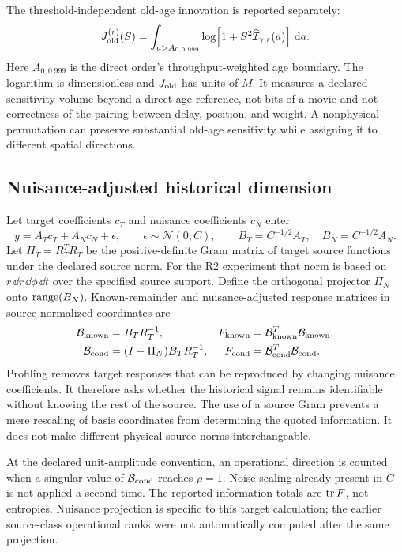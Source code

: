 The threshold-independent old-age innovation is reported separately:
\begin{equation}
J_{\rm old}^{(r)}(S)=\int_{a>A_{0,0.999}}
\log\!\left[1+S^2\widehat{\mathcal I}_{\gamma,r}(a)\right]\,\mathrm d a.
\label{eq:jold}
\end{equation}
Here $A_{0,0.999}$ is the direct order's throughput-weighted age boundary. The logarithm is dimensionless and $J_{\rm old}$ has units of $M$. It measures a declared sensitivity volume beyond a direct-age reference, not bits of a movie and not correctness of the pairing between delay, position, and weight. A nonphysical permutation can preserve substantial old-age sensitivity while assigning it to different spatial directions.

\subsection{Nuisance-adjusted historical dimension}\label{sec:nuisance}
Let target coefficients $c_T$ and nuisance coefficients $c_N$ enter
\begin{equation}
y=A_Tc_T+A_Nc_N+\epsilon,\qquad
\epsilon\sim\mathcal N(0,C),\qquad
B_T=C^{-1/2}A_T,\quad B_N=C^{-1/2}A_N.
\label{eq:targetnuisance}
\end{equation}
Let $H_T=R_T^TR_T$ be the positive-definite Gram matrix of target source functions under the declared source norm. For the R2 experiment that norm is based on $r\,\dd r\,\dd\phi\,\dd t$ over the specified source support. Define the orthogonal projector $\Pi_N$ onto $\operatorname{range}(B_N)$. Known-remainder and nuisance-adjusted response matrices in source-normalized coordinates are
\begin{align}
\mathcal B_{\rm known}&=B_TR_T^{-1},&
F_{\rm known}&=\mathcal B_{\rm known}^T\mathcal B_{\rm known},\nonumber\\
\mathcal B_{\rm cond}&=(I-\Pi_N)B_TR_T^{-1},&
F_{\rm cond}&=\mathcal B_{\rm cond}^T\mathcal B_{\rm cond}.
\label{eq:conditionalfisher}
\end{align}
Profiling removes target responses that can be reproduced by changing nuisance coefficients. It therefore asks whether the historical signal remains identifiable without knowing the rest of the source. The use of a source Gram prevents a mere rescaling of basis coordinates from determining the quoted information. It does not make different physical source norms interchangeable.

At the declared unit-amplitude convention, an operational direction is counted when a singular value of $\mathcal B_{\rm cond}$ reaches $\rho=1$. Noise scaling already present in $C$ is not applied a second time. The reported information totals are $\operatorname{tr} F$, not entropies. Nuisance projection is specific to this target calculation; the earlier source-class operational ranks were not automatically computed after the same projection.

